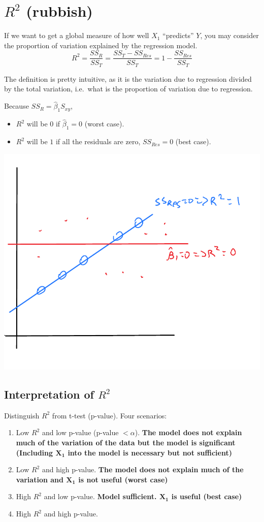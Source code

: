 \documentclass[12 pt]{article}
\begin{document}
    \section{$R^2$ (rubbish)}
    If we want to get a global measure of how well $X_1$ ``predicts''
    $Y$, you may consider the proportion of variation explained by the
    regression model.
    $$R^2 = \frac{SS_R}{SS_T} = \frac{SS_T - SS_{Res}}{SS_T} = 1 -
    \frac{SS_{Res}}{SS_T}$$

    The definition is pretty intuitive, as it is the variation due to
    regression divided by the total variation, i.e.\ what is the
    proportion of variation due to regression.

    Because $SS_R = \hat{\beta}_1 S_{xy}$,
    \begin{itemize}
    \item $R^2$ will be $0$ if $\hat{\beta}_1 = 0$ (worst case).
    \item $R^2$ will be $1$ if all the residuals are zero, $SS_{Res} =
      0$ (best case).
    \end{itemize}
    \includegraphics[width=.5\textwidth]{24.pdf}
    \subsection{Interpretation of $R^2$}
    Distinguish $R^2$ from t-test (p-value). Four scenarios:
    \begin{enumerate}
    \item Low $R^2$ and low p-value (p-value $< \alpha$). \textbf{The
        model does not explain much of the variation of the data but the
        model is significant (Including $\mathbf{X_1}$ into the model is
        necessary but not sufficient)}
    \item Low $R^2$ and high p-value. \textbf{The model does not
        explain much of the variation and $\mathbf{X_1}$ is not useful
      (worst case)}
  \item High $R^2$ and low p-value. \textbf{Model
      sufficient. $\mathbf{X_1}$ is useful (best case)}
  \item High $R^2$ and high p-value.
  \end{enumerate}
\end{document}
